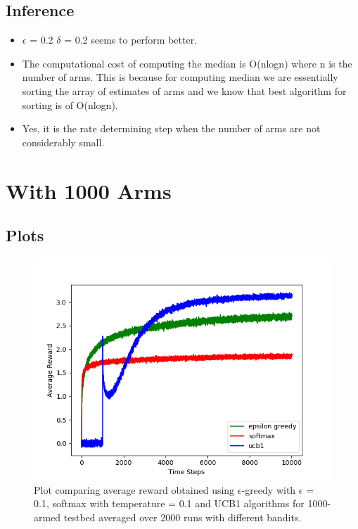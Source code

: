 \documentclass[english]{article}
\begin{document}
\subsection{Inference}
\begin{itemize}
    \item  $\epsilon$ = 0.2 $\delta$ = 0.2 seems to perform better.
    \item The computational cost of computing the median is O(nlogn) where n is the number of arms. This is because for computing median we are essentially sorting the array of estimates of arms and we know that best algorithm for sorting is of O(nlogn).
    \item Yes, it is the rate determining step when the number of arms are not considerably small.
\end{itemize}
\pagebreak

\section{With 1000 Arms}
\subsection{Plots}
\begin{figure}[H]
    \centering
    \includegraphics[width=\linewidth]{plot_1000arms_rew.png}
    \caption{Plot comparing average reward obtained using $\epsilon$-greedy with $\epsilon$ = 0.1, softmax with temperature = 0.1 and UCB1 algorithms for 1000-armed testbed averaged over 2000 runs with different bandits.}
    \label{fig:eg1}
\end{figure}
\end{document}
